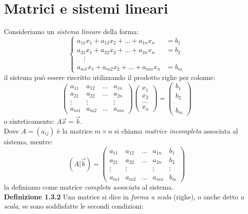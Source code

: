 \documentclass{article}
\begin{document}
\section{Matrici e sistemi lineari}
Consideriamo un \textit{sistema lineare} della forma: 
\begin{equation*}
  \left\{
  \begin{aligned}
    a_{11}x_1 + a_{12}x_2 + \dots + a_{1n}x_n &= b_1 \\
    a_{21}x_1 + a_{22}x_2 + \dots + a_{2n}x_n &= b_2 \\ 
    \quad \vdots \quad \\
    a_{m1}x_1 + a_{m2}x_2 + \dots + a_{mn}x_n &= b_m
  \end{aligned}
  \right.
\end{equation*}
il sistema può essere riscritto utilizzando il prodotto righe per colonne:
\[
\begin{pmatrix}
  a_{11} & a_{12} & \dots{} & a_{1n} \\
  a_{21} & a_{22} & \dots{} & a_{2n} \\
  \vdots{} & \vdots & & \vdots \\
  a_{m1} & a_{m2} & \dots{} & a_{mn}
\end{pmatrix}
\begin{pmatrix}
  x_1 \\
  x_2 \\
  \dots \\
  x_n
\end{pmatrix}
=
\begin{pmatrix}
  b_1 \\
  b_2 \\
  \dot{} \\
  b_m
\end{pmatrix}
\]
o sinteticamente: \(A\vec{x}=\vec{b}\). \\
Dove \(A=(a_{ij})\) è la matrice \textit{$m \times n$} si chiama \textit{matrice incompleta} associata al sistema, mentre: 
\[
(A|\vec{b})=
\left(
\begin{array}{cccc|c}
a_{11} & a_{12} & \dots & a_{1n} & b_1 \\
a_{21} & a_{22} & \dots & a_{2n} & b_2 \\
\vdots & \vdots &  & \vdots & \vdots \\
a_{m1} & a_{m2} & \dots & a_{mn} & b_m
\end{array}
\right)
\]
la definiamo come matrice \textit{completa associata} al sistema. 
\vspace{1em} \\\textbf{Definizione 1.3.2} Una matrice si dice in \textit{forma a scala} (righe), o anche detto \textit{a scala}, se sono soddisfatte le secondi condizioni:
\end{document}
